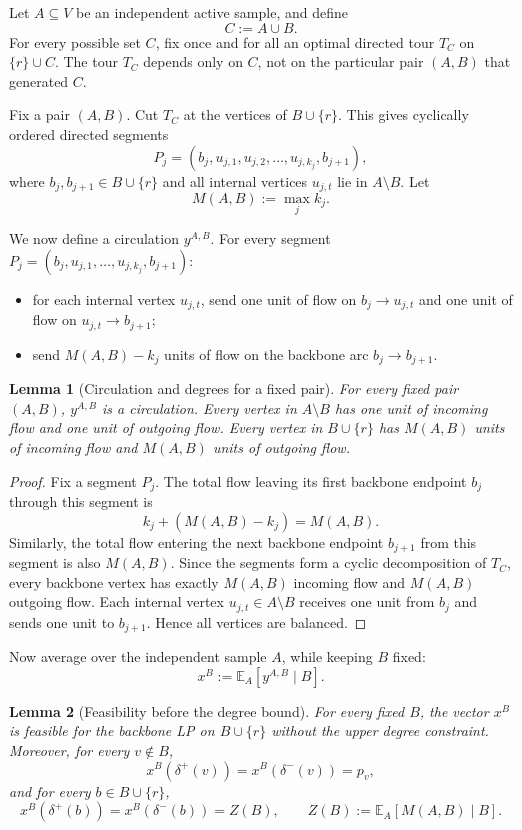 \documentclass[11pt]{article}
\newtheorem{lemma}{Lemma}
\newcommand{\E}{\mathbb{E}}
\newcommand{\1}{\mathbf{1}}
\begin{document}
Let $A\subseteq V$ be an independent active sample, and define
\[
  C := A\cup B.
\]
For every possible set $C$, fix once and for all an optimal directed tour
$T_C$ on $\{r\}\cup C$.  The tour $T_C$ depends only on $C$, not on the
particular pair $(A,B)$ that generated $C$.

Fix a pair $(A,B)$.  Cut $T_C$ at the vertices of $B\cup\{r\}$.  This gives
cyclically ordered directed segments
\[
  P_j=(b_j,u_{j,1},u_{j,2},\ldots,u_{j,k_j},b_{j+1}),
\]
where $b_j,b_{j+1}\in B\cup\{r\}$ and all internal vertices
$u_{j,t}$ lie in $A\setminus B$.  Let
\[
  M(A,B):=\max_j k_j.
\]

We now define a circulation $y^{A,B}$.  For every segment
$P_j=(b_j,u_{j,1},\ldots,u_{j,k_j},b_{j+1})$:
\begin{itemize}[leftmargin=2em]
  \item for each internal vertex $u_{j,t}$, send one unit of flow on
  $b_j\to u_{j,t}$ and one unit of flow on $u_{j,t}\to b_{j+1}$;
  \item send $M(A,B)-k_j$ units of flow on the backbone arc
  $b_j\to b_{j+1}$.
\end{itemize}

\begin{lemma}[Circulation and degrees for a fixed pair]
For every fixed pair $(A,B)$, $y^{A,B}$ is a circulation.  Every vertex in
$A\setminus B$ has one unit of incoming flow and one unit of outgoing flow.
Every vertex in $B\cup\{r\}$ has $M(A,B)$ units of incoming flow and
$M(A,B)$ units of outgoing flow.
\end{lemma}

\begin{proof}
Fix a segment $P_j$.  The total flow leaving its first backbone endpoint
$b_j$ through this segment is
\[
  k_j+(M(A,B)-k_j)=M(A,B).
\]
Similarly, the total flow entering the next backbone endpoint $b_{j+1}$ from
this segment is also $M(A,B)$.  Since the segments form a cyclic decomposition
of $T_C$, every backbone vertex has exactly $M(A,B)$ incoming flow and
$M(A,B)$ outgoing flow.  Each internal vertex $u_{j,t}\in A\setminus B$ receives
one unit from $b_j$ and sends one unit to $b_{j+1}$.  Hence all vertices are
balanced.
\end{proof}

Now average over the independent sample $A$, while keeping $B$ fixed:
\[
  x^B := \E_A[y^{A,B}\mid B].
\]

\begin{lemma}[Feasibility before the degree bound]
For every fixed $B$, the vector $x^B$ is feasible for the backbone LP on
$B\cup\{r\}$ without the upper degree constraint.  Moreover, for every
$v\notin B$,
\[
  x^B(\delta^+(v))=x^B(\delta^-(v))=p_v,
\]
and for every $b\in B\cup\{r\}$,
\[
  x^B(\delta^+(b))=x^B(\delta^-(b))=
  Z(B),
  \qquad
  Z(B):=\E_A[M(A,B)\mid B].
\]
\end{lemma}
\end{document}
